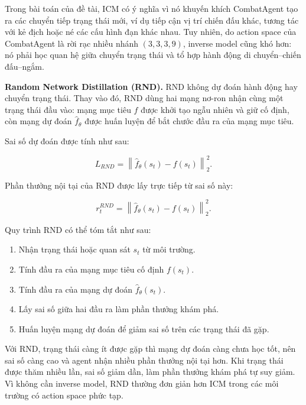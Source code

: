 Trong bài toán của đề tài, ICM có ý nghĩa vì nó khuyến khích CombatAgent tạo ra các chuyển tiếp trạng thái mới, ví dụ tiếp cận vị trí chiến đấu khác, tương tác với kẻ địch hoặc né các cấu hình đạn khác nhau. Tuy nhiên, do action space của CombatAgent là rời rạc nhiều nhánh $(3,3,3,9)$, inverse model cũng khó hơn: nó phải học quan hệ giữa chuyển trạng thái và tổ hợp hành động di chuyển--chiến đấu--ngắm.

\textbf{Random Network Distillation (RND).}
RND không dự đoán hành động hay chuyển trạng thái. Thay vào đó, RND dùng hai mạng nơ-ron nhận cùng một trạng thái đầu vào: mạng mục tiêu $f$ được khởi tạo ngẫu nhiên và giữ cố định, còn mạng dự đoán $\hat{f}_{\theta}$ được huấn luyện để bắt chước đầu ra của mạng mục tiêu.

Sai số dự đoán được tính như sau:

\begin{equation}
    L_{RND} =
    \left\|
    \hat{f}_{\theta}(s_t) - f(s_t)
    \right\|_2^2.
\end{equation}

Phần thưởng nội tại của RND được lấy trực tiếp từ sai số này:

\begin{equation}
    r_t^{RND} =
    \left\|
    \hat{f}_{\theta}(s_t) - f(s_t)
    \right\|_2^2.
\end{equation}

Quy trình RND có thể tóm tắt như sau:

\begin{enumerate}
    \item Nhận trạng thái hoặc quan sát $s_t$ từ môi trường.
    \item Tính đầu ra của mạng mục tiêu cố định $f(s_t)$.
    \item Tính đầu ra của mạng dự đoán $\hat{f}_{\theta}(s_t)$.
    \item Lấy sai số giữa hai đầu ra làm phần thưởng khám phá.
    \item Huấn luyện mạng dự đoán để giảm sai số trên các trạng thái đã gặp.
\end{enumerate}

Với RND, trạng thái càng ít được gặp thì mạng dự đoán càng chưa học tốt, nên sai số càng cao và agent nhận nhiều phần thưởng nội tại hơn. Khi trạng thái được thăm nhiều lần, sai số giảm dần, làm phần thưởng khám phá tự suy giảm. Vì không cần inverse model, RND thường đơn giản hơn ICM trong các môi trường có action space phức tạp.

